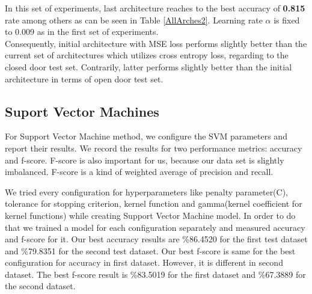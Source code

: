 \documentclass[conference]{IEEEtran}
\begin{document}
In this set of experiments, last architecture reaches to the best accuracy of \textbf{0.815 }rate among others as can be seen in Table \ref{AllArches2}. Learning rate $\alpha$ is fixed to 0.009 as in the first set of experiments.\\
 
Consequently, initial architecture with MSE loss performs slightly better than the current set of architectures which utilizes cross entropy loss, regarding to the closed door test set. Contrarily, latter performs slightly better than the initial architecture in terms of open door test set. 

\subsection{Suport Vector Machines}
For Support Vector Machine method, we configure the SVM parameters and report their results. We record the results for two performance metrics: accuracy and f-score. F-score is also important for us, because our data set is slightly imbalanced. F-score is a kind of weighted average of precision and recall.

We tried every configuration for hyperparameters like penalty parameter(C), tolerance for stopping criterion, kernel function and gamma(kernel coefficient for kernel functions) while creating Support Vector Machine model. In order to do that we trained a model for each configuration separately and measured accuracy and f-score for it. Our best accuracy results are \%86.4520 for the first test dataset and \%79.8351 for the second test dataset. Our best f-score is same for the best configuration for accuracy in first dataset. However, it is different in second dataset. The best f-score result is \%83.5019 for the first dataset and \%67.3889 for the second dataset.
\end{document}

